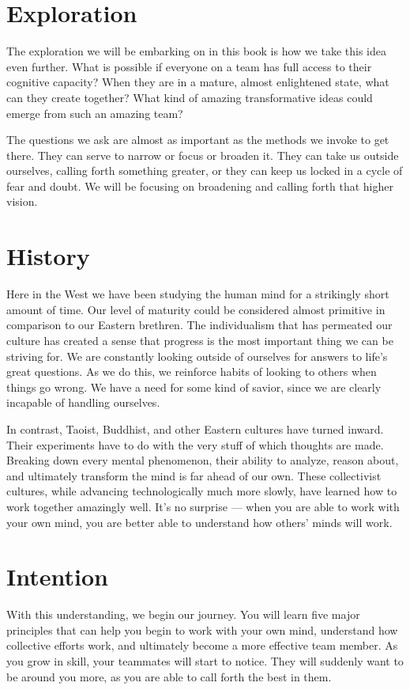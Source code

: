 \section{Exploration}

The exploration we will be embarking on in this book is how we take this idea even further. What is possible
if everyone on a team has full access to their cognitive capacity? When they are in a mature, almost
enlightened state, what can they create together? What kind of amazing transformative ideas could emerge
from such an amazing team?

The questions we ask are almost as important as the methods we invoke to get there. They can serve
to narrow or focus or broaden it. They can take us outside ourselves, calling forth something greater, or
they can keep us locked in a cycle of fear and doubt. We will be focusing on broadening and calling
forth that higher vision.

\section{History}

Here in the West we have been studying the human mind for a strikingly short amount of time. Our
level of maturity could be considered almost primitive in comparison to our Eastern brethren. The
individualism that has permeated our culture has created a sense that progress is the most important
thing we can be striving for. We are constantly looking outside of ourselves for answers to life's 
great questions. As we do this, we reinforce habits of looking to others when things go wrong. We
have a need for some kind of savior, since we are clearly incapable of handling ourselves.

In contrast, Taoist, Buddhist, and other Eastern cultures have turned inward. Their experiments have
to do with the very stuff of which thoughts are made. Breaking down every mental phenomenon, their 
ability to analyze, reason about, and ultimately transform the mind is far ahead of our own. These
collectivist cultures, while advancing technologically much more slowly, have learned how to work 
together amazingly well. It's no surprise --- when you are able to work with your own mind, you 
are better able to understand how others' minds will work.

\section{Intention}

With this understanding, we begin our journey. You will learn five major principles that can help
you begin to work with your own mind, understand how collective efforts work, and ultimately become
a more effective team member. As you grow in skill, your teammates will start to notice. They will 
suddenly want to be around you more, as you are able to call forth the best in them. 
